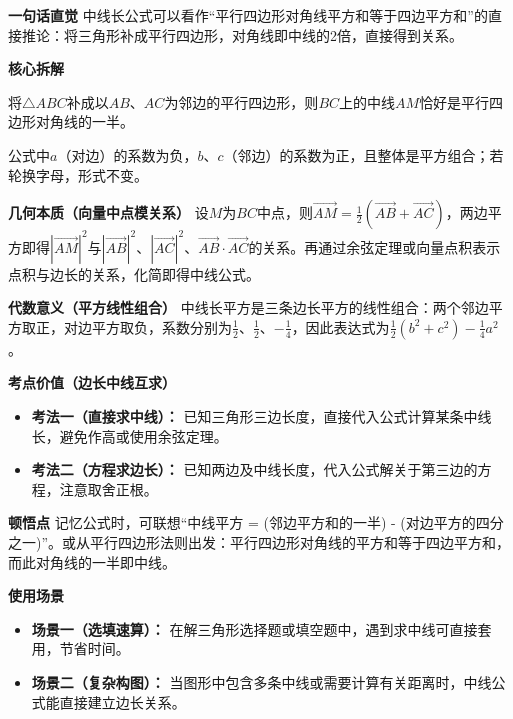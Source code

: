 \begin{explanationbox}
	\textbf{\textcolor{CExplanation}{一句话直觉}}
	中线长公式可以看作“平行四边形对角线平方和等于四边平方和”的直接推论：将三角形补成平行四边形，对角线即中线的2倍，直接得到关系。

	\medskip
	\textbf{\textcolor{CExplanation}{核心拆解}}
	\begin{description}[style=nextline, leftmargin=2.8em, labelsep=0.5em, itemsep=0.45em]
		\item[\textbf{要点一（平行四边形背景）：}]
			将$\triangle ABC$补成以$AB$、$AC$为邻边的平行四边形，则$BC$上的中线$AM$恰好是平行四边形对角线的一半。
		\item[\textbf{要点二（公式对称结构）：}]
			公式中$a$（对边）的系数为负，$b$、$c$（邻边）的系数为正，且整体是平方组合；若轮换字母，形式不变。
	\end{description}

	\medskip
	\textbf{\textcolor{CExplanation}{几何本质（向量中点模关系）}}
	设$M$为$BC$中点，则$\overrightarrow{AM} = \frac12(\overrightarrow{AB} + \overrightarrow{AC})$，两边平方即得$|\overrightarrow{AM}|^2$与$|\overrightarrow{AB}|^2$、$|\overrightarrow{AC}|^2$、$\overrightarrow{AB}\cdot\overrightarrow{AC}$的关系。再通过余弦定理或向量点积表示点积与边长的关系，化简即得中线公式。

	\medskip
	\textbf{\textcolor{CExplanation}{代数意义（平方线性组合）}}
	中线长平方是三条边长平方的线性组合：两个邻边平方取正，对边平方取负，系数分别为$\frac12$、$\frac12$、$-\frac14$，因此表达式为$\frac12(b^2+c^2)-\frac14 a^2$。

	\medskip
	\textbf{\textcolor{CExplanation}{考点价值（边长中线互求）}}
	\begin{itemize}[leftmargin=*, itemsep=0.5em, topsep=0.4em]
		\item \textbf{考法一（直接求中线）：} 已知三角形三边长度，直接代入公式计算某条中线长，避免作高或使用余弦定理。
		\item \textbf{考法二（方程求边长）：} 已知两边及中线长度，代入公式解关于第三边的方程，注意取舍正根。
	\end{itemize}

	\medskip
	\textbf{\textcolor{CExplanation}{顿悟点}}
	记忆公式时，可联想“中线平方 = (邻边平方和的一半) - (对边平方的四分之一)”。或从平行四边形法则出发：平行四边形对角线的平方和等于四边平方和，而此对角线的一半即中线。

	\medskip
	\textbf{\textcolor{CExplanation}{使用场景}}
	\begin{itemize}[leftmargin=*, itemsep=0.5em, topsep=0.4em]
		\item \textbf{场景一（选填速算）：} 在解三角形选择题或填空题中，遇到求中线可直接套用，节省时间。
		\item \textbf{场景二（复杂构图）：} 当图形中包含多条中线或需要计算有关距离时，中线公式能直接建立边长关系。
	\end{itemize}

\end{explanationbox}
